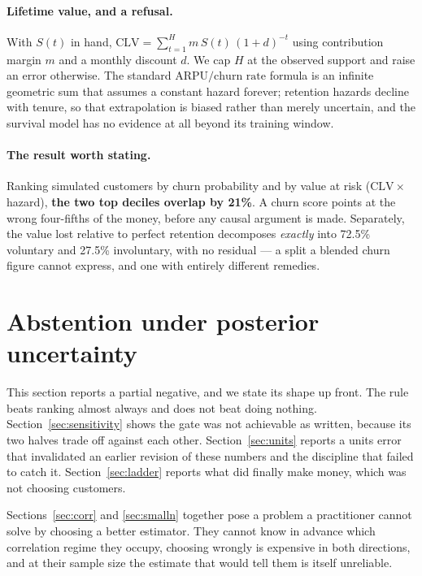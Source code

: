 \documentclass[11pt,a4paper]{article}
\begin{document}
\paragraph{Lifetime value, and a refusal.} With $S(t)$ in hand,
$\mathrm{CLV} = \sum_{t=1}^{H} m\, S(t)\,(1+d)^{-t}$ using contribution margin $m$
and a monthly discount $d$. We cap $H$ at the observed support and raise an error
otherwise. The standard $\mathrm{ARPU}/\text{churn rate}$ formula is an infinite
geometric sum that assumes a constant hazard forever; retention hazards decline with
tenure, so that extrapolation is biased rather than merely uncertain, and the
survival model has no evidence at all beyond its training window.

\paragraph{The result worth stating.} Ranking simulated customers by churn
probability and by value at risk ($\mathrm{CLV} \times$ hazard), \textbf{the two top
deciles overlap by 21\%}. A churn score points at the wrong four-fifths of the
money, before any causal argument is made. Separately, the value lost relative to
perfect retention decomposes \emph{exactly} into 72.5\% voluntary and 27.5\%
involuntary, with no residual --- a split a blended churn figure cannot express, and
one with entirely different remedies.

\section{Abstention under posterior uncertainty}
\label{sec:abstain}

This section reports a partial negative, and we state its shape up front. The rule
beats ranking almost always and does not beat doing nothing.
Section~\ref{sec:sensitivity} shows the gate was not achievable as written, because its
two halves trade off against each other. Section~\ref{sec:units} reports a units error
that invalidated an earlier revision of these numbers and the discipline that failed to
catch it. Section~\ref{sec:ladder} reports what did finally make money, which was not
choosing customers.

Sections~\ref{sec:corr} and \ref{sec:smalln} together pose a problem a practitioner
cannot solve by choosing a better estimator. They cannot know in advance which
correlation regime they occupy, choosing wrongly is expensive in both directions,
and at their sample size the estimate that would tell them is itself unreliable.
\end{document}
